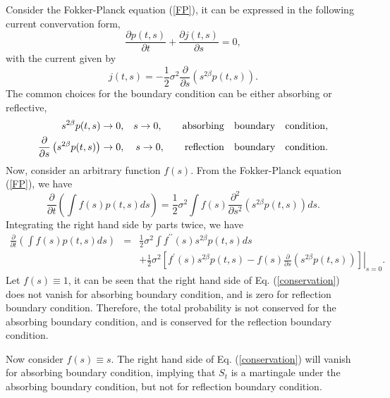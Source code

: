 \documentclass[12pt]{article}
\begin{document}
  Consider the Fokker-Planck equation (\ref{FP}), it can be expressed in the following current convervation form,
  \begin{equation}
    \frac{\partial p(t,s)}{\partial t} + \frac{\partial j(t,s)}{\partial s} = 0,
  \end{equation}
  with the current given by
  \begin{equation}
    j(t,s) = -\frac{1}{2}\sigma^2\frac{\partial }{\partial s}\left(s^{2\beta}p(t,s)\right).
  \end{equation}
  The common choices for the boundary condition can be either absorbing or reflective,
  \begin{eqnarray}
    s^{2\beta}p(t,s) \rightarrow 0,
        && s\rightarrow 0,\quad\quad {\rm absorbing\quad boundary \quad condition}, \\
    \frac{\partial}{\partial s}\left(s^{2\beta}p(t,s)\right) \rightarrow 0,
        && s\rightarrow 0,\quad\quad {\rm reflection \quad boundary \quad condition}.
  \end{eqnarray}
  Now, consider an arbitrary function $f(s)$. From the Fokker-Planck equation (\ref{FP}), we
  have
  \begin{equation}
    \frac{\partial}{\partial t}\left(\int f(s)p(t,s)ds\right) = \frac{1}{2}\sigma^2\int f(s)\frac{\partial^2}{\partial s^2}
    \left(s^{2\beta}p(t,s)\right)ds.
  \end{equation}
  Integrating the right hand side by parts twice, we have
  \begin{eqnarray}
    \frac{\partial}{\partial t}\left(\int f(s)p(t,s)ds\right) &=& \frac{1}{2}\sigma^2\int f^{\prime\prime}(s)s^{2\beta}p(t,s)ds\nonumber \\
          && + \left . \frac{1}{2}\sigma^2\left[f^{\prime}(s)s^{2\beta}p(t,s) - f(s)\frac{\partial}{\partial s}
                \left(s^{2\beta}p(t,s)\right)\right]\right|_{s=0}.
    \label{conservation}
  \end{eqnarray}
  Let $f(s)\equiv 1$, it can be seen that the right hand side of Eq. (\ref{conservation}) does not vanish for absorbing
  boundary condition, and is zero for reflection boundary condition. Therefore, the total probability is not conserved for
  the absorbing boundary condition, and is conserved for the reflection boundary condition.

  Now consider $f(s)\equiv s$. The right hand side of Eq. (\ref{conservation}) will vanish for absorbing
  boundary condition, implying that $S_t$ is a martingale under the absorbing boundary condition, but not for reflection
  boundary condition.
\end{document}

